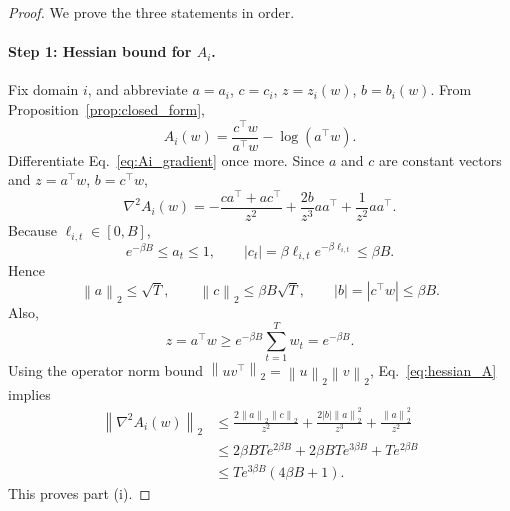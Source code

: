 \documentclass{article}
\newcommand{\norm}[1]{\left\lVert #1 \right\rVert}
\begin{document}
\begin{proof}
We prove the three statements in order.

\paragraph{Step 1: Hessian bound for \(A_i\).}
Fix domain \(i\), and abbreviate \(a=a_i\), \(c=c_i\), \(z=z_i(w)\), \(b=b_i(w)\). From Proposition~\ref{prop:closed_form},
\begin{equation}
    A_i(w)=\frac{c^\top w}{a^\top w} - \log(a^\top w).
\end{equation}
Differentiate Eq.~\eqref{eq:Ai_gradient} once more. Since \(a\) and \(c\) are constant vectors and \(z=a^\top w\), \(b=c^\top w\),
\begin{equation}
    \nabla^2 A_i(w)
    =
    -\frac{ca^\top + ac^\top}{z^2}
    +
    \frac{2b}{z^3} aa^\top
    +
    \frac{1}{z^2} aa^\top.
    \label{eq:hessian_A}
\end{equation}
Because \(\ell_{i,t}\in[0,B]\),
\begin{equation}
    e^{-\beta B} \le a_t \le 1,
    \qquad
    |c_t| = \beta \ell_{i,t} e^{-\beta \ell_{i,t}} \le \beta B.
\end{equation}
Hence
\begin{equation}
    \norm{a}_2 \le \sqrt{T},
    \qquad
    \norm{c}_2 \le \beta B \sqrt{T},
    \qquad
    |b| = |c^\top w| \le \beta B.
\end{equation}
Also,
\begin{equation}
    z = a^\top w \ge e^{-\beta B}\sum_{t=1}^{T}w_t = e^{-\beta B}.
\end{equation}
Using the operator norm bound \(\norm{uv^\top}_2 = \norm{u}_2\norm{v}_2\), Eq.~\eqref{eq:hessian_A} implies
\begin{align}
    \norm{\nabla^2 A_i(w)}_2
    &\le
    \frac{2\norm{a}_2\norm{c}_2}{z^2}
    +
    \frac{2|b| \norm{a}_2^2}{z^3}
    +
    \frac{\norm{a}_2^2}{z^2} \\
    &\le
    2\beta B T e^{2\beta B}
    +
    2\beta B T e^{3\beta B}
    +
    T e^{2\beta B} \\
    &\le
    T e^{3\beta B}(4\beta B + 1).
\end{align}
This proves part (i).


\end{proof}
\end{document}
